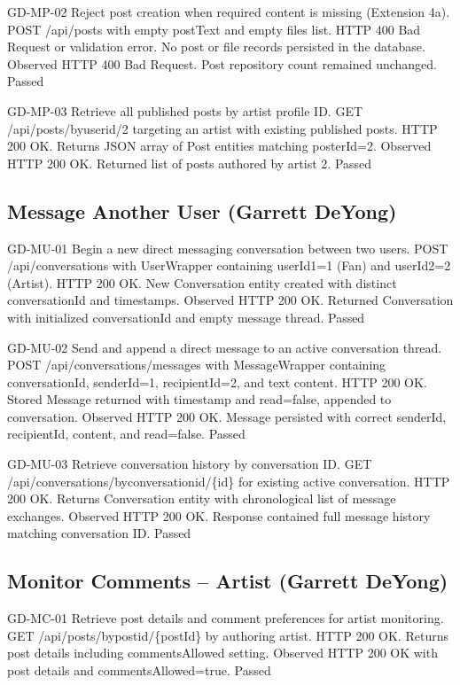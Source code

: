 \documentclass[11pt]{report}
\begin{document}
\garretttestcase
{GD-MP-02}
{Reject post creation when required content is missing (Extension 4a).}
{POST /api/posts with empty postText and empty files list.}
{HTTP 400 Bad Request or validation error. No post or file records persisted in the database.}
{Observed HTTP 400 Bad Request. Post repository count remained unchanged.}
{Passed}

\clearpage
\garretttestcase
{GD-MP-03}
{Retrieve all published posts by artist profile ID.}
{GET /api/posts/byuserid/2 targeting an artist with existing published posts.}
{HTTP 200 OK. Returns JSON array of Post entities matching posterId=2.}
{Observed HTTP 200 OK. Returned list of posts authored by artist 2.}
{Passed}

\subsection*{Message Another User (Garrett DeYong)}
\garretttestcase
{GD-MU-01}
{Begin a new direct messaging conversation between two users.}
{POST /api/conversations with UserWrapper containing userId1=1 (Fan) and userId2=2 (Artist).}
{HTTP 200 OK. New Conversation entity created with distinct conversationId and timestamps.}
{Observed HTTP 200 OK. Returned Conversation with initialized conversationId and empty message thread.}
{Passed}

\clearpage
\garretttestcase
{GD-MU-02}
{Send and append a direct message to an active conversation thread.}
{POST /api/conversations/messages with MessageWrapper containing conversationId, senderId=1, recipientId=2, and text content.}
{HTTP 200 OK. Stored Message returned with timestamp and read=false, appended to conversation.}
{Observed HTTP 200 OK. Message persisted with correct senderId, recipientId, content, and read=false.}
{Passed}

\garretttestcase
{GD-MU-03}
{Retrieve conversation history by conversation ID.}
{GET /api/conversations/byconversationid/\{id\} for existing active conversation.}
{HTTP 200 OK. Returns Conversation entity with chronological list of message exchanges.}
{Observed HTTP 200 OK. Response contained full message history matching conversation ID.}
{Passed}

\clearpage
\subsection*{Monitor Comments -- Artist (Garrett DeYong)}
\garretttestcase
{GD-MC-01}
{Retrieve post details and comment preferences for artist monitoring.}
{GET /api/posts/bypostid/\{postId\} by authoring artist.}
{HTTP 200 OK. Returns post details including commentsAllowed setting.}
{Observed HTTP 200 OK with post details and commentsAllowed=true.}
{Passed}
\end{document}
